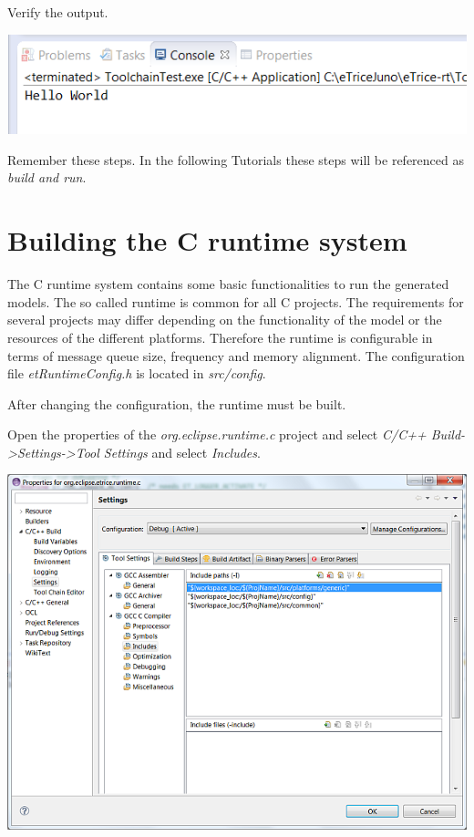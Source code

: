 Verify the output.

\includegraphics{images/032-SetupWorkspaceC07.png}

Remember these steps. In the following Tutorials these steps will be referenced as \textit{build and run}.


\section{Building the C runtime system}

The C runtime system contains some basic functionalities to run the generated models. The so called runtime is common for all C projects. The requirements for several projects may differ depending on the functionality of the model or the resources of the different platforms. Therefore the runtime is configurable in terms of message queue size, frequency and memory alignment. The configuration file \textit{etRuntimeConfig.h} is located in \textit{src/config}.

After changing the configuration, the runtime must be built.

Open the properties of the \textit{org.eclipse.runtime.c} project and select \textit{C/C++ Build->Settings->Tool Settings} and select \textit{Includes}.

\includegraphics{images/032-SetupWorkspaceC08.png}

